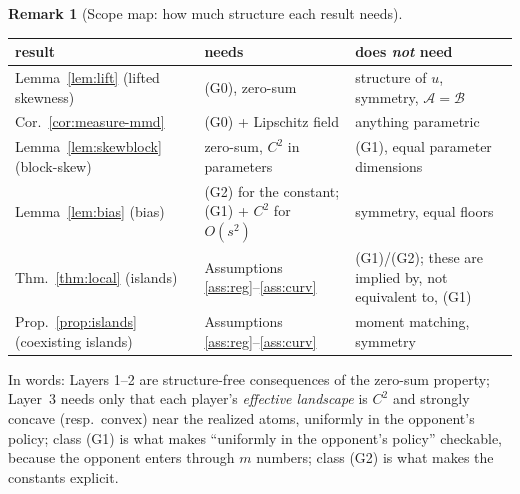 \documentclass[11pt]{article}
\theoremstyle{definition}
\newtheorem{remark}{Remark}
\newcommand{\cA}{\mathcal{A}}
\newcommand{\cB}{\mathcal{B}}
\begin{document}
\begin{remark}[Scope map: how much structure each result needs]\label{rem:scope}
\begin{center}
\begin{tabular}{lll}
\hline
result & needs & does \emph{not} need\\
\hline
Lemma~\ref{lem:lift} (lifted skewness) & (G0), zero-sum & structure of $u$,
symmetry, $\cA = \cB$\\
Cor.~\ref{cor:measure-mmd} & (G0) + Lipschitz field & anything parametric\\
Lemma~\ref{lem:skewblock} (block-skew) & zero-sum, $C^2$ in parameters &
(G1), equal parameter dimensions\\
Lemma~\ref{lem:bias} (bias) & (G2) for the constant; (G1) + $C^2$ for
$O(s^2)$ & symmetry, equal floors\\
Thm.~\ref{thm:local} (islands) & Assumptions \ref{ass:reg}--\ref{ass:curv} &
(G1)/(G2); these are implied by, not equivalent to, (G1)\\
Prop.~\ref{prop:islands} (coexisting islands) & Assumptions
\ref{ass:reg}--\ref{ass:curv} & moment matching, symmetry\\
\hline
\end{tabular}
\end{center}
In words: Layers 1--2 are structure-free consequences of the zero-sum property;
Layer~3 needs only that each player's \emph{effective landscape} is $C^2$ and
strongly concave (resp.\ convex) near the realized atoms, uniformly in the
opponent's policy; class (G1) is what makes ``uniformly in the opponent's
policy'' checkable, because the opponent enters through $m$ numbers; class (G2)
is what makes the constants explicit.
\end{remark}
\end{document}
